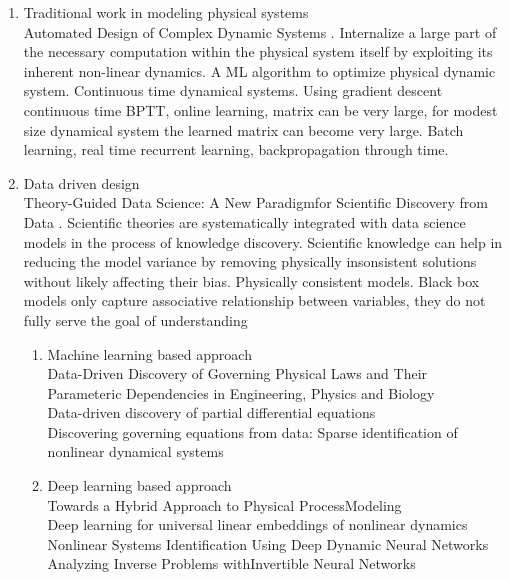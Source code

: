 \documentclass[conference]{IEEEtran}
\begin{document}
\begin{enumerate}
  \item Traditional work in modeling physical systems \\
  Automated Design of Complex Dynamic Systems \cite{hermans2014automated}. Internalize a large part of the necessary computation within the physical system itself by exploiting its inherent non-linear dynamics. A ML algorithm to optimize physical dynamic system. Continuous time dynamical systems. Using gradient descent continuous time BPTT, online learning, matrix can be very large, for modest size dynamical system the learned matrix can become very large. Batch learning, real time recurrent learning, backpropagation through time.

  \item Data driven design \\
  Theory-Guided Data Science: A New Paradigmfor Scientific Discovery from Data \cite{karpatne2017theory-guided}. Scientific theories are systematically integrated with data science models in the process of knowledge discovery. Scientific knowledge can help in reducing the model variance by removing physically insonsistent solutions without likely affecting their bias. Physically consistent models. Black box models only capture associative relationship between variables, they do not fully serve the goal of understanding 
  \begin{enumerate}
    \item Machine learning based approach \\
      Data-Driven Discovery of Governing Physical Laws and Their Parameteric Dependencies in Engineering, Physics and Biology \cite{kutz2017datadriven} \\
      Data-driven discovery of partial differential equations \cite{rudy2017datadriven} \\
      Discovering governing equations from data: Sparse identification of nonlinear dynamical systems \cite{Brunton3932} \\
    \item Deep learning based approach \\
      Towards a Hybrid Approach to Physical ProcessModeling \\
      Deep learning for universal linear embeddings of nonlinear dynamics \cite{lusch2017deep} \\
      Nonlinear Systems Identification Using Deep Dynamic Neural Networks \cite{ogunmolu2016nonlinear}\\
      Analyzing Inverse Problems withInvertible Neural Networks \cite{ardizzone2018analyzing}\\

\end{enumerate}
\end{enumerate}
\end{document}
